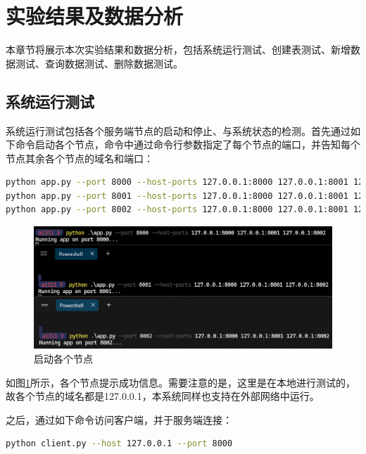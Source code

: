 \section{实验结果及数据分析}

本章节将展示本次实验结果和数据分析，包括系统运行测试、创建表测试、新增数据测试、查询数据测试、删除数据测试。

\subsection{系统运行测试}

系统运行测试包括各个服务端节点的启动和停止、与系统状态的检测。首先通过如下命令启动各个节点，命令中通过命令行参数指定了每个节点的端口，并告知每个节点其余各个节点的域名和端口：

\begin{lstlisting}[language=bash]
python app.py --port 8000 --host-ports 127.0.0.1:8000 127.0.0.1:8001 127.0.0.1:8002
python app.py --port 8001 --host-ports 127.0.0.1:8000 127.0.0.1:8001 127.0.0.1:8002
python app.py --port 8002 --host-ports 127.0.0.1:8000 127.0.0.1:8001 127.0.0.1:8002
\end{lstlisting}

\begin{figure}[H]
    \includegraphics[width=\textwidth]{examples/各节点启动.png}
    \centering
    \caption{启动各个节点}
    \label{fig:test-start}
\end{figure}

如图\ref{fig:test-start}所示，各个节点提示成功信息。需要注意的是，这里是在本地进行测试的，故各个节点的域名都是127.0.0.1，本系统同样也支持在外部网络中运行。

之后，通过如下命令访问客户端，并于服务端连接：

\begin{lstlisting}[language=bash]
python client.py --host 127.0.0.1 --port 8000
\end{lstlisting}

